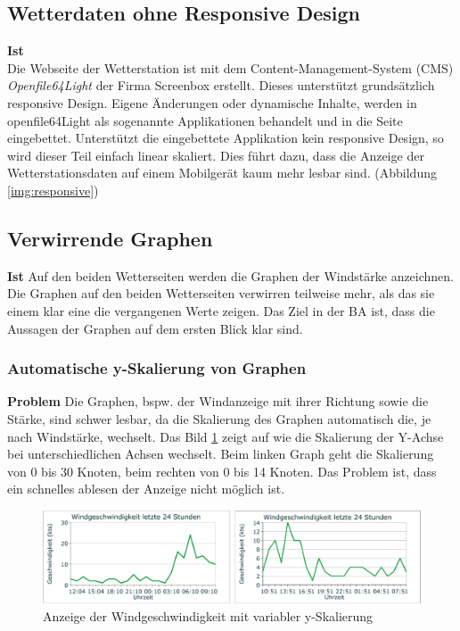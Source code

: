 \subsection{Wetterdaten ohne Responsive Design}
\textbf{Ist}\\
Die Webseite der Wetterstation ist mit dem Content-Management-System (CMS) \textit{Openfile64Light} der Firma Screenbox erstellt. Dieses unterstützt grundsätzlich responsive Design. Eigene Änderungen oder dynamische Inhalte, werden in openfile64Light als sogenannte Applikationen behandelt und in die Seite eingebettet. Unterstützt die eingebettete Applikation kein responsive Design, so wird dieser Teil einfach linear skaliert. Dies führt dazu, dass die Anzeige der Wetterstationsdaten auf einem Mobilgerät kaum mehr lesbar sind. (Abbildung \ref{img:responsive})





\subsection{Verwirrende Graphen}
\textbf{Ist}
Auf den beiden Wetterseiten werden die Graphen der Windstärke anzeichnen.  
Die Graphen auf den beiden Wetterseiten verwirren teilweise mehr, als das sie einem klar eine die vergangenen Werte zeigen. Das Ziel in der BA ist, dass die Aussagen der Graphen auf dem ersten Blick klar sind.

\subsubsection{Automatische y-Skalierung von Graphen}
\textbf{Problem}
Die Graphen, bspw. der Windanzeige mit ihrer Richtung sowie die Stärke, sind schwer lesbar, da die Skalierung des Graphen automatisch die, je nach Windstärke, wechselt. Das Bild \ref{img:wind-geschw} zeigt auf wie die Skalierung der Y-Achse bei unterschiedlichen Achsen wechselt. Beim linken Graph geht die Skalierung von 0 bis 30 Knoten, beim rechten von 0 bis 14 Knoten. Das Problem ist, dass ein schnelles ablesen der Anzeige nicht möglich ist.

\begin{figure}[h!]
	\centering
	\includegraphics[width=1\linewidth]{img/wind-geschw}
	\caption{Anzeige der Windgeschwindigkeit mit variabler y-Skalierung}
	\label{img:wind-geschw}
\end{figure}



